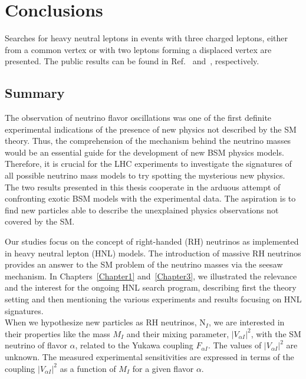 
\chapter{Conclusions}\label{Chapter7} 

Searches for heavy neutral leptons in events with three charged
leptons, either from a common vertex or with two leptons forming a
displaced vertex are presented. The public
results can be found in Ref.~\cite{Sirunyan:2018mtv} and~\cite{CMS-PAS-EXO-20-009}, respectively.\\

\section{Summary}
The observation of neutrino flavor oscillations was one of the first 
definite experimental indications of the
presence of new physics not described by the SM theory. 
Thus, the comprehension of the mechanism behind the neutrino masses would be an essential guide for the development of new BSM physics models. Therefore, it is crucial for the LHC experiments to investigate the signatures of all possible neutrino mass models to try spotting the mysterious new physics.\\
The two results presented in this thesis cooperate in the arduous attempt of confronting exotic BSM
models with the experimental data. The aspiration is to find new
particles able to describe the unexplained
physics observations not covered by the SM. 

Our studies focus on the concept of right-handed (RH) neutrinos as
implemented in heavy neutral lepton (HNL) models. The introduction of massive RH
neutrinos provides an answer to the SM problem of the
neutrino masses via the seesaw mechanism.  
In Chapters~\ref{Chapter1} and~\ref{Chapter3}, we illustrated
the relevance and the interest for the
ongoing HNL search program, describing first the theory setting 
and then mentioning the various experiments and results
focusing on HNL signatures.\\
When we hypothesize new particles as RH neutrinos, N$_{I}$, we
are interested in their properties like the mass $M_I$ and
their mixing parameter, $|V_{\alpha I}|^2$,  with the SM neutrino of flavor $\alpha$,
related to the Yukawa coupling $F_{\alpha I}$. The values of $|V_{\alpha
  I}|^2$ are unknown. The measured experimental
sensitivities are expressed in
terms of the coupling $|V_{\alpha I}|^2$
as a function of $M_I$ for a given flavor $\alpha$. 

